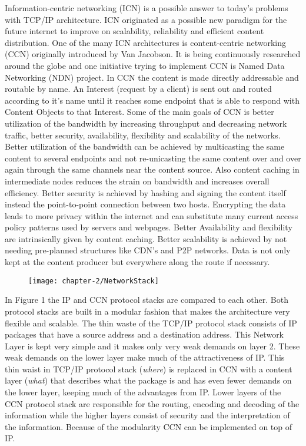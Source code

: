 Information-centric networking (ICN) is a possible answer to today's problems with TCP/IP architecture. ICN originated as a possible new paradigm for the future internet to improve on scalability, reliability and efficient content distribution. One of the many ICN architectures is content-centric networking (CCN) originally introduced by Van Jacobson. It is being continuously researched around the globe and one initiative trying to implement CCN is Named Data Networking (NDN) project. 
In CCN the content is made directly addressable and routable by name. An Interest (request by a client) is sent out and routed according to it's name until it reaches some endpoint that is able to respond with Content Objects to that Interest. Some of the main goals of CCN is better utilization of the bandwidth by increasing throughput and decreasing network traffic, better security, availability, flexibility and scalability of the networks. Better utilization of the bandwidth can be achieved by multicasting the same content to several endpoints and not re-unicasting the same content over and over again through the same channels near the content source. Also content caching in intermediate nodes reduces the strain on bandwidth and increases overall efficiency. Better security is achieved by hashing and signing the content itself instead the point-to-point connection between two hosts. Encrypting the data leads to more privacy within the internet and can substitute many current access policy patterns used by servers and webpages. Better Availability and flexibility are intrinsically given by content caching. Better scalability is achieved by not needing pre-planned structures like CDN's and P2P networks. Data is not only kept at the content producer but everywhere along the route if necessary.

\begin{figure}[H]
\texttt{[image: chapter-2/NetworkStack]}
\centering
\end{figure}

In Figure 1 the IP and CCN protocol stacks are compared to each other. Both protocol stacks are built in a modular fashion that makes the architecture very flexible and scalable. The thin waste of the TCP/IP protocol stack consists of IP packages that have a source address and a destination address. This Network Layer is kept very simple and it makes only very weak demands on layer 2. These weak demands on the lower layer make much of the attractiveness of IP. This thin waist in TCP/IP protocol stack (\emph{where}) is replaced in CCN with a content layer (\emph{what}) that describes what the package is and has even fewer demands on the lower layer, keeping much of the advantages from IP. Lower layers of the CCN protocol stack are responsible for the routing, encoding and decoding of the information while the higher layers consist of security and the interpretation of the information. Because of the modularity CCN can be implemented on top of IP.

